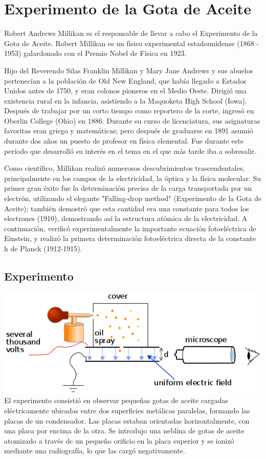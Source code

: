\documentclass[letterpaper, 10pt, journal]{IEEEtran}
\begin{document}
\section{Experimento de la Gota de Aceite}
Robert Andrews Millikan es el responsable de llevar a cabo el Experimento de la Gota de Aceite. Robert Millikan es un físico experimental estadounidense (1868 - 1953) galardonado con el Premio Nobel de Física en 1923. 

Hijo del Reverendo Silas Franklin Millikan y Mary Jane Andrews y sus abuelos pertenecían a la población de Old New England, que había llegado a Estados Unidos antes de 1750, y eran colonos pioneros en el Medio Oeste. Dirigió una existencia rural en la infancia, asistiendo a la Maquoketa High School (Iowa). Después de trabajar por un corto tiempo como reportero de la corte, ingresó en Oberlin College (Ohio) en 1886. Durante su curso de licenciatura, sus asignaturas favoritas eran griego y matemáticas; pero después de graduarse en 1891 asumió durante dos años un puesto de profesor en física elemental. Fue durante este período que desarrolló su interés en el tema en el que más tarde iba a sobresalir.

Como científico, Millikan realizó numerosos descubrimientos trascendentales, principalmente en los campos de la electricidad, la óptica y la física molecular. Su primer gran éxito fue la determinación precisa de la carga transportada por un electrón, utilizando el elegante "Falling-drop method" (Experimento de la Gota de Aceite); también demostró que esta cantidad era una constante para todos los electrones (1910), demostrando así la estructura atómica de la electricidad. A continuación, verificó experimentalmente la importante ecuación fotoeléctrica de Einstein, y realizó la primera determinación fotoeléctrica directa de la constante h de Planck (1912-1915).

\subsection{Experimento}
\includegraphics[scale=0.4]{dropmethod}
El experimento consistió en observar pequeñas gotas de aceite cargadas eléctricamente ubicadas entre dos superficies metálicas paralelas, formando las placas de un condensador. Las placas estaban orientadas horizontalmente, con una placa por encima de la otra. Se introdujo una neblina de gotas de aceite atomizado a través de un pequeño orificio en la placa superior y se ionizó mediante una radiografía, lo que las cargó negativamente.
 
\end{document}
